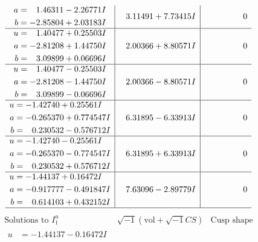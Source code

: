 \documentclass[1p]{elsarticle_modified}
\theoremstyle{definition}
\newcommand{\I}{\sqrt{-1}}
\begin{document}
$$\begin{array}{c|c|c}
\begin{aligned}
a &= \phantom{-}1.46311 - 2.26771 I \\
b &= -2.85804 + 2.03183 I\end{aligned}
 & \phantom{-}3.11491 + 7.73415 I & \phantom{-0.000000 } 0 \\ \hline\begin{aligned}
u &= \phantom{-}1.40477 + 0.25503 I \\
a &= -2.81208 + 1.44750 I \\
b &= \phantom{-}3.09899 + 0.06696 I\end{aligned}
 & \phantom{-}2.00366 + 8.80571 I & \phantom{-0.000000 } 0 \\ \hline\begin{aligned}
u &= \phantom{-}1.40477 - 0.25503 I \\
a &= -2.81208 - 1.44750 I \\
b &= \phantom{-}3.09899 - 0.06696 I\end{aligned}
 & \phantom{-}2.00366 - 8.80571 I & \phantom{-0.000000 } 0 \\ \hline\begin{aligned}
u &= -1.42740 + 0.25561 I \\
a &= -0.265370 + 0.774547 I \\
b &= \phantom{-}0.230532 - 0.576712 I\end{aligned}
 & \phantom{-}6.31895 - 6.33913 I & \phantom{-0.000000 } 0 \\ \hline\begin{aligned}
u &= -1.42740 - 0.25561 I \\
a &= -0.265370 - 0.774547 I \\
b &= \phantom{-}0.230532 + 0.576712 I\end{aligned}
 & \phantom{-}6.31895 + 6.33913 I & \phantom{-0.000000 } 0 \\ \hline\begin{aligned}
u &= -1.44137 + 0.16472 I \\
a &= -0.917777 - 0.491847 I \\
b &= \phantom{-}0.614103 + 0.432152 I\end{aligned}
 & \phantom{-}7.63096 - 2.89779 I & \phantom{-0.000000 } 0\\
 \hline 
 \end{array}$$\newpage$$\begin{array}{c|c|c}  
\text{Solutions to }I^u_{1}& \I (\text{vol} + \sqrt{-1}CS) & \text{Cusp shape}\\
 \hline 
\begin{aligned}
u &= -1.44137 - 0.16472 I \\

\end{aligned}
\end{array}$$
\end{document}
